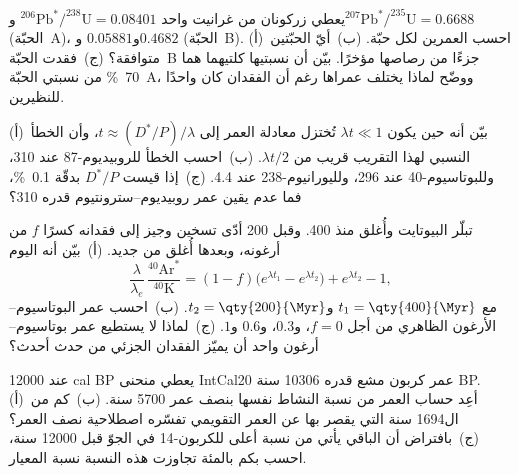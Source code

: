 \begin{exercise}[$\star\star$]\label{exo:b1:radiometric-methods:9}
يعطي زركونان من غرانيت واحد $^{206}\mathrm{Pb}^*/^{238}\mathrm{U} = 0.08401$ و$^{207}\mathrm{Pb}^*/^{235}\mathrm{U} = 0.6688$ (الحبّة~A)، و$0.05881$ و$0.4682$ (الحبّة~B). (أ)~احسب العمرين لكل حبّة. (ب)~أيّ الحبّتين متوافقة؟ (ج)~فقدت الحبّة~B جزءًا من رصاصها مؤخرًا. بيّن أن نسبتيها كلتيهما هما \qty{70}{\percent} من نسبتي الحبّة~A، ووضّح لماذا يختلف عمراها رغم أن الفقدان كان واحدًا للنظيرين.
\end{exercise}

\begin{exercise}[$\star\star\star$]\label{exo:b1:radiometric-methods:10}
(أ)~بيّن أنه حين يكون $\lambda t \ll 1$ تُختزل معادلة العمر إلى $t \approx
(D^*/P)/\lambda$، وأن الخطأ النسبي لهذا التقريب قريب من $\lambda t/2$. (ب)~احسب الخطأ للروبيديوم-87 عند \qty{310}{\Ma}، وللبوتاسيوم-40 عند \qty{296}{\Ma}، ولليورانيوم-238 عند \qty{4.4}{\Ga}. (ج)~إذا قيست $D^*/P$ بدقّة \qty{0.1}{\percent}، فما عدم يقين عمر روبيديوم–سترونتيوم قدره \qty{310}{\Ma}؟
\end{exercise}

\begin{exercise}[$\star\star\star$]\label{exo:b1:radiometric-methods:11}
تبلّر البيوتايت وأُغلق منذ \qty{400}{\Myr}. وقبل \qty{200}{\Myr} أدّى تسخين وجيز إلى فقدانه كسرًا $f$ من أرغونه، وبعدها أُغلق من جديد. (أ)~بيّن أنه اليوم
\[
  \frac{\lambda}{\lambda_e}\,\frac{^{40}\mathrm{Ar}^*}{^{40}\mathrm{K}} =
  (1 - f)\bigl(e^{\lambda t_1} - e^{\lambda t_2}\bigr) + e^{\lambda t_2} - 1,
\]
مع $t_1 = \qty{400}{\Myr}$ و$t_2 = \qty{200}{\Myr}$. (ب)~احسب عمر البوتاسيوم–الأرغون الظاهري من أجل $f = 0$، و$0.3$، و$0.6$ و$1$. (ج)~لماذا لا يستطيع عمر بوتاسيوم–أرغون واحد أن يميّز الفقدان الجزئي من حدث أحدث؟
\end{exercise}

\begin{exercise}[$\star\star\star$]\label{exo:b1:radiometric-methods:12}
عند \num{12000} cal BP يعطي منحنى IntCal20 عمر كربون مشع قدره \num{10306} سنة BP. (أ)~أعِد حساب العمر من نسبة النشاط نفسها بنصف عمر \num{5700} سنة. (ب)~كم من ال\num{1694} سنة التي يقصر بها  عن العمر التقويمي تفسّره اصطلاحية نصف العمر؟ (ج)~بافتراض أن الباقي يأتي من نسبة أعلى للكربون-14 في الجوّ قبل \num{12000} سنة، احسب بكم بالمئة تجاوزت هذه النسبة نسبة المعيار.
\end{exercise}

